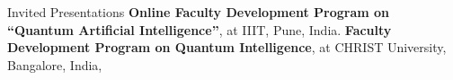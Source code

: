 \begin{rubric}{Invited Presentations}
\entry*[25/05/2021] \textbf{Online Faculty Development Program on “Quantum Artificial Intelligence”}, at IIIT, Pune, India.
\entry*[27/2/2021] \textbf{Faculty Development Program on Quantum Intelligence}, at CHRIST University, Bangalore, India, 
\end{rubric}
